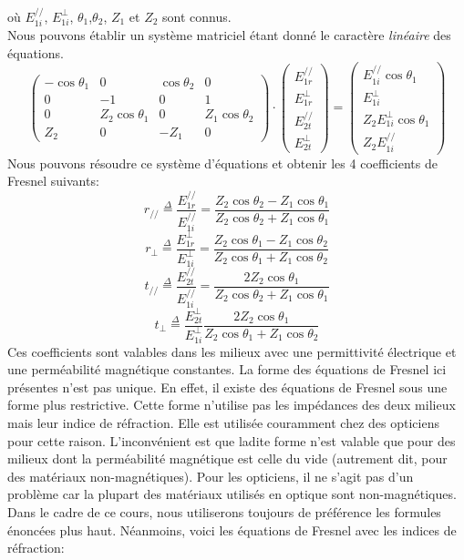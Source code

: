 où $E_{1i}^{//}$, $E_{1i}^{\perp}$, $\theta_{1}$,$\theta_{2}$, $Z_1$ et $Z_2$ sont connus. \\
Nous pouvons établir un système matriciel étant donné le caractère \textit{linéaire} des équations.
	$$
	\begin{pmatrix}
	-\cos \theta_{1} & 0 & \cos \theta_{2}& 0\\
	0 & -1 & 0 & 1\\
	0 & Z_2\cos \theta_{1} & 0 & Z_1\cos \theta_{2}\\ 
	Z_2 & 0 & -Z_1 & 0
	\end{pmatrix}
	\cdot
	\begin{pmatrix}
	E_{1r}^{//}\\
	E_{1r}^{\perp}\\
	E_{2t}^{//} \\ 
	E_{2t}^{\perp}
	\end{pmatrix}
	=
	\begin{pmatrix}
	E_{1i}^{//} \cos \theta_{1}\\
	E_{1i}^{\perp} \\
	Z_2E_{1i}^{\perp} \cos \theta_{1} \\
	Z_2E_{1i}^{//}
	\end{pmatrix}
	$$
Nous pouvons résoudre ce système d'équations et obtenir les 4 coefficients de Fresnel suivants:
\[r_{//} \overset{\Delta}= \frac{E_{1r}^{//}}{E_{1i}^{//}} = \frac{Z_{2}\cos \theta_{2} - Z_{1} \cos \theta_{1} }{Z_{2} \cos \theta_{2} + Z_{1} \cos \theta_{1} } \]
\[r_{\perp} \overset{\Delta}= \frac{E_{1r}^{\perp}}{E_{1i}^{\perp}} = \frac{Z_{2}\cos \theta_{1} - Z_{1} \cos \theta_{2} }{Z_{2} \cos \theta_{1} + Z_{1} \cos \theta_{2}}\]
\[t_{//} \overset{\Delta}= \frac{E_{2t}^{//}}{E_{1i}^{//}} = \frac{2 Z_{2} \cos \theta_{1} }{Z_{2} \cos \theta_{2} + Z_{1} \cos \theta_{1}} \]
\[t_{\perp} \overset{\Delta}= \frac{E_{2t}^{\perp}}{E_{1i}^{\perp}} \frac{2 Z_{2} \cos \theta_{1} }{Z_{2} \cos \theta_{1} + Z_{1} \cos \theta_{2}}\]
Ces coefficients sont valables dans les milieux avec une permittivité électrique et une perméabilité magnétique constantes. La forme des équations de Fresnel ici présentes n'est pas unique. En effet, il existe des équations de Fresnel sous une forme plus restrictive. Cette forme n'utilise pas les impédances des deux milieux mais leur indice de réfraction. Elle est utilisée couramment chez des opticiens pour cette raison. L'inconvénient est que ladite forme n'est valable que pour des milieux dont la perméabilité magnétique est celle du vide (autrement dit, pour des matériaux non-magnétiques). Pour les opticiens, il ne s'agit pas d'un problème car la plupart des matériaux utilisés en optique sont non-magnétiques. Dans le cadre de ce cours, nous utiliserons toujours de préférence les formules énoncées plus haut. Néanmoins, voici les équations de Fresnel avec les indices de réfraction: 
